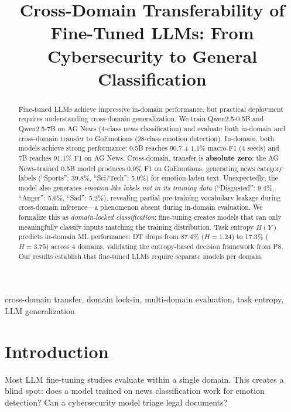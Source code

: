 \documentclass[journal]{IEEEtran}
\begin{document}
\title{Cross-Domain Transferability of Fine-Tuned LLMs: From Cybersecurity to General Classification}
\author{
}
\maketitle

\begin{abstract}
Fine-tuned LLMs achieve impressive in-domain performance, but practical deployment requires understanding cross-domain generalization. We train Qwen2.5-0.5B and Qwen2.5-7B on AG News (4-class news classification) and evaluate both in-domain and cross-domain transfer to GoEmotions (28-class emotion detection). In-domain, both models achieve strong performance: 0.5B reaches $90.7 \pm 1.1$\% macro-F1 (4 seeds) and 7B reaches 91.1\% F1 on AG News. Cross-domain, transfer is \textbf{absolute zero}: the AG News-trained 0.5B model produces 0.0\% F1 on GoEmotions, generating news category labels (``Sports'': 39.8\%, ``Sci/Tech'': 5.0\%) for emotion-laden text. Unexpectedly, the model also generates \emph{emotion-like labels not in its training data} (``Disgusted'': 9.4\%, ``Anger'': 5.6\%, ``Sad'': 5.2\%), revealing partial pre-training vocabulary leakage during cross-domain inference---a phenomenon absent during in-domain evaluation. We formalize this as \emph{domain-locked classification}: fine-tuning creates models that can only meaningfully classify inputs matching the training distribution. Task entropy $H(Y)$ predicts in-domain ML performance: DT drops from 87.4\% ($H=1.24$) to 17.3\% ($H=3.75$) across 4 domains, validating the entropy-based decision framework from P8. Our results establish that fine-tuned LLMs require separate models per domain.
\end{abstract}
\begin{IEEEkeywords}
cross-domain transfer, domain lock-in, multi-domain evaluation, task entropy, LLM generalization
\end{IEEEkeywords}

\section{Introduction}
Most LLM fine-tuning studies evaluate within a single domain. This creates a blind spot: does a model trained on news classification work for emotion detection? Can a cybersecurity model triage legal documents?
\end{document}
